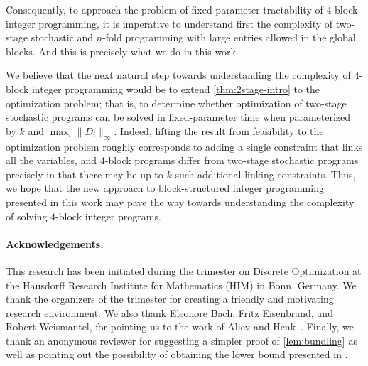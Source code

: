 \documentclass{theoretics}
\makeatletter
\newcommand{\Oh}{{\mathcal{O}}}
\newcommand\IfRestateTF{%
  \ifx\label\thmt@gobble@label %
    \expandafter\@firstoftwo
  \else
    \expandafter\@secondoftwo
  \fi
}
\newcommand{\RestateRemark}{\IfRestateTF{{\normalfont\bfseries (Restated) }}{}}
\makeatother
\begin{document}

Consequently, to approach the problem of fixed-parameter tractability of $4$-block integer programming, it is imperative to understand first the complexity of two-stage stochastic and $n$-fold programming with large entries allowed in the global blocks. And this is precisely what we do in this work.

We believe that the next natural step towards understanding the complexity of $4$-block integer programming would be to extend \cref{thm:2stage-intro} to the optimization problem; that is, to determine whether optimization of two-stage stochastic programs can be solved in fixed-parameter time when parameterized by $k$ and $\max_i \|D_i\|_\infty$. Indeed, lifting the result from feasibility to the optimization problem roughly corresponds to adding a single constraint that links all the variables, and $4$-block programs differ from two-stage stochastic programs precisely in that there may be up to $k$ such additional linking constraints. Thus, we hope that the  new approach to block-structured integer programming presented in this work may pave the way towards understanding the complexity of solving $4$-block integer programs.

\paragraph*{Acknowledgements.} This research has been initiated during the trimester on Discrete Optimization at the Hausdorff Research Institute for Mathematics (HIM) in Bonn, Germany. We thank the organizers of the trimester for creating a friendly and motivating research environment. We also thank Eleonore Bach, Fritz Eisenbrand, and Robert Weismantel, for pointing us to the work of Aliev and Henk~\cite{AlievH10}. Finally, we thank an anonymous reviewer for suggesting a simpler proof of \cref{lem:bundling} as well as pointing out the possibility of obtaining the lower bound presented in .
\end{document}
